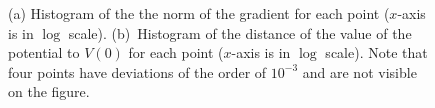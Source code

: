 \documentclass[11pt,a4paper]{article}
\begin{document}
	\begin{figure}
		\centering
		\subfigure{\label{fig:log_Vp4}}
		\vspace{-1cm}
		\caption{(a) Histogram of the the norm of the gradient for each point ($x$-axis is in $\log$ scale). (b)~Histogram of the distance of the value of the potential to $V(0)$ for each point ($x$-axis is in $\log$ scale). Note that four points have deviations of the order of $10^{-3}$ and are not visible on the figure.}
		\label{fig:Analyze_V_points}
	\end{figure}
	
\end{document}
